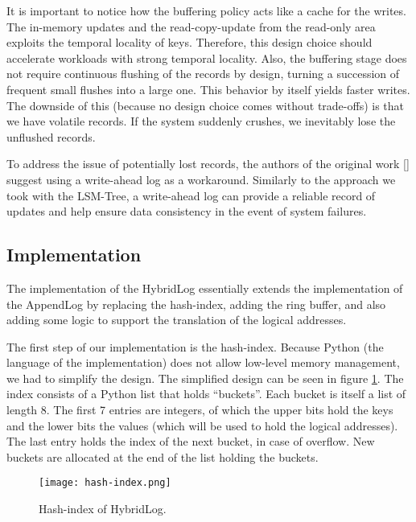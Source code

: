 It is important to notice how the buffering policy acts like a cache for the writes.
The in-memory updates and the read-copy-update from the read-only area exploits the temporal locality of keys.
Therefore, this design choice should accelerate workloads with strong temporal locality. Also, the buffering stage does not require continuous flushing of the records by design, turning a succession of frequent small flushes into a large one. This behavior by itself yields faster writes. The downside of this (because no design choice comes without trade-offs) is that we have volatile records. If the system suddenly crushes, we inevitably lose the unflushed records.

To address the issue of potentially lost records, the authors of the original work [\cite{faster}] suggest using a write-ahead log as a workaround.
Similarly to the approach we took with the LSM-Tree, a write-ahead log can provide a reliable record of updates and help ensure data consistency in the event of system failures.

\subsection{Implementation}

The implementation of the HybridLog essentially extends the implementation of the AppendLog by replacing the hash-index, adding the ring buffer, and also adding some logic to support the translation of the logical addresses.

The first step of our implementation is the hash-index. Because Python (the language of the implementation) does not allow low-level memory management, we had to simplify the design.
The simplified design can be seen in figure \ref{fig:hash-index}.
The index consists of a Python list that holds ``buckets''.
Each bucket is itself a list of length 8. The first 7 entries are integers, of which the upper bits hold the keys and the lower bits the values (which will be used to hold the logical addresses). The last entry holds the index of the next bucket, in case of overflow.
New buckets are allocated at the end of the list holding the buckets.

\begin{figure}[h]
    \centering
    \texttt{[image: hash-index.png]}
    \caption{Hash-index of HybridLog.}
    \label{fig:hash-index}
\end{figure}

